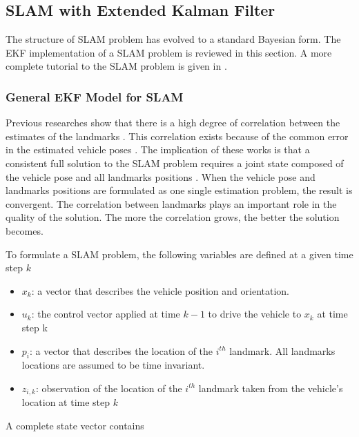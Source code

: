 \subsection{SLAM with Extended Kalman Filter}
The structure of SLAM problem has evolved to a standard
Bayesian form. The EKF implementation of a SLAM problem is reviewed in
this section. A more complete tutorial to the SLAM problem is given in
\cite{durrant-whyte_simultaneous_2006}
\cite{bailey_simultaneous_2006}.

\subsubsection{General EKF Model for SLAM}
Previous researches show that there is a high degree of correlation
between the estimates of the landmarks
\cite{smith_representation_1986} \cite{durrant-whyte_uncertain_1988}.
This correlation exists because of the common error in the estimated
vehicle poses \cite{leonard_simultaneous_1991}. The implication of
these works is that a consistent full solution to the SLAM problem
requires a joint state composed of the vehicle pose and all landmarks
positions \cite{durrant-whyte_simultaneous_2006}. When the vehicle
pose and landmarks positions are formulated as one single estimation
problem, the result is convergent. The correlation between landmarks
plays an important role in the quality of the solution. The more the
correlation grows, the better the solution becomes.
\cite{durrant-whyte_localization_1996} \cite{csorba_new_1996}
\cite{csorba_simultaneous_1997} \cite{dissanayake_solution_2001}

To formulate a SLAM problem, the following variables are defined at a given time step $k$
\begin{itemize}
  \item $x_k$: a vector that describes the vehicle position and
orientation.
  \item $u_k$: the control vector applied at time $k-1$ to drive the
vehicle to $x_k$ at time step k
  \item $p_i$: a vector that describes the location of the $i^{th}$
landmark. All landmarks locations are assumed to be time invariant.
  \item $z_{i,k}$: observation of the location of the $i^{th}$
landmark taken from the vehicle's location at time step $k$
\end{itemize}

\noindent A complete state vector contains 

